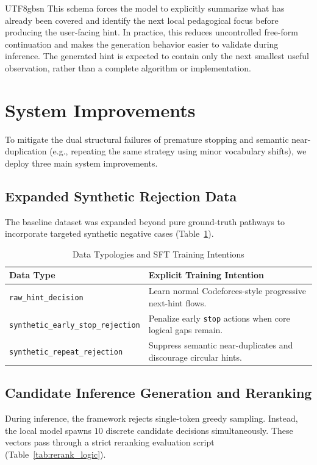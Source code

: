 \documentclass{article}
\begin{document}
\begin{CJK*}{UTF8}{gbsn}
This schema forces the model to explicitly summarize what has already been covered and identify the next local pedagogical focus before producing the user-facing hint. In practice, this reduces uncontrolled free-form continuation and makes the generation behavior easier to validate during inference. The generated hint is expected to contain only the next smallest useful observation, rather than a complete algorithm or implementation.

\section{System Improvements}
To mitigate the dual structural failures of premature stopping and semantic near-duplication (e.g., repeating the same strategy using minor vocabulary shifts), we deploy three main system improvements.

\subsection{Expanded Synthetic Rejection Data}
The baseline dataset was expanded beyond pure ground-truth pathways to incorporate targeted synthetic negative cases (Table~\ref{tab:data_types}).

\begin{table}[h]
  \caption{Data Typologies and SFT Training Intentions}
  \label{tab:data_types}
  \centering
  \begin{tabular}{ll}
    \toprule
    Data Type & Explicit Training Intention \\
    \midrule
    \texttt{raw\_hint\_decision} & Learn normal Codeforces-style progressive next-hint flows. \\
    \texttt{synthetic\_early\_stop\_rejection} & Penalize early \texttt{stop} actions when core logical gaps remain. \\
    \texttt{synthetic\_repeat\_rejection} & Suppress semantic near-duplicates and discourage circular hints. \\
    \bottomrule
  \end{tabular}
\end{table}

\subsection{Candidate Inference Generation and Reranking}
During inference, the framework rejects single-token greedy sampling. Instead, the local model spawns $10$ discrete candidate decisions simultaneously. These vectors pass through a strict reranking evaluation script (Table~\ref{tab:rerank_logic}).


\end{CJK*}
\end{document}
